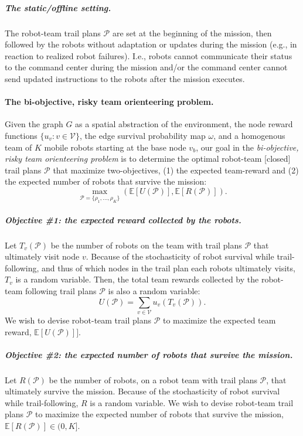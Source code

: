 \documentclass[11pt, oneside]{article}
\begin{document}
\vspace{-\baselineskip}
\subparagraph{The static/offline setting.} 
The robot-team trail plans $\mathcal{P}$ are set at the beginning of the mission, then followed by the robots without adaptation or updates during the mission (e.g., in reaction to realized robot failures). 
I.e., robots cannot communicate their status to the command center during the mission and/or the command center cannot send updated instructions to the robots after the mission executes.

\paragraph{The bi-objective, risky team orienteering problem.}
Given the graph $G$ as a spatial abstraction of the environment, the node reward functions $\{u_v : v \in\mathcal{V}\}$, the edge survival probability map $\omega$, and a homogenous team of $K$ mobile robots starting at the base node $v_b$, our goal in the \emph{bi-objective, risky team orienteering problem} is to determine the optimal robot-team [closed] trail plans $\mathcal{P}$ that maximize two-objectives, (1) the expected team-reward and (2) the expected number of robots that survive the mission:
\begin{equation}
\max_{\mathcal{P}=\{\rho_1, ..., \rho_K\}} \left( \mathbb{E}[U(\mathcal{P})], \mathbb{E}[R(\mathcal{P})] \right).
\label{eq:the_two_objs}
\end{equation}

\vspace{-\baselineskip}
\subparagraph{Objective \#1: the expected reward collected by the robots.}
Let $T_v(\mathcal{P}) $ be the number of robots on the team with trail plans $\mathcal{P}$ that ultimately visit node $v$.
Because of the stochasticity of robot survival while trail-following, and thus of which nodes in the trail plan each robots ultimately visits, $T_v$ is a random variable.
Then, the total team rewards collected by the robot-team following trail plans $\mathcal{P}$ is also a random variable:
\begin{equation}
U(\mathcal{P}) = \sum_{v\in\mathcal{V}} u_v\left ( T_v(\mathcal{P}) \right).
\end{equation}
We wish to devise robot-team trail plans $\mathcal{P}$ to maximize the expected team reward, $\mathbb{E}[U(\mathcal{P})]]$.

\vspace{-\baselineskip}
\subparagraph{Objective \#2: the expected number of robots that survive the mission.}
Let $R(\mathcal{P})$ be the number of robots, on a robot team with trail plans $\mathcal{P}$, that ultimately survive the mission. Because of the stochasticity of robot survival while trail-following, $R$ is a random variable. We wish to devise robot-team trail plans $\mathcal{P}$ to maximize the expected number of robots that survive the mission, $\mathbb{E}[R(\mathcal{P})] \in (0, K]$.
\end{document}
